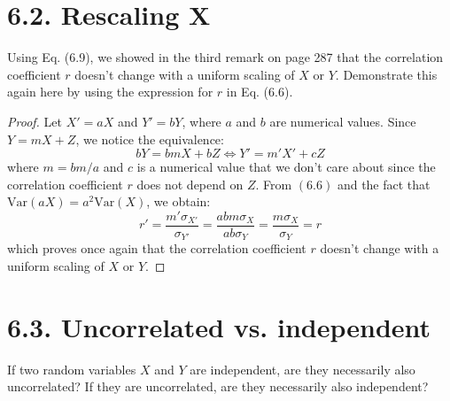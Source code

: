 \section*{6.2. Rescaling X}
Using Eq. (6.9), we showed in the third remark on page 287 that the
correlation coefficient $r$ doesn't change with a uniform scaling of
$X$ or $Y$. Demonstrate this again here by using the expression
for $r$ in Eq. (6.6).

\vspace{1em}

\begin{proof}
    Let $X' = aX$ and $Y' = bY$, where $a$ and $b$ are numerical values.
    Since $Y = mX + Z$, we notice the equivalence:
    \[
        bY = bmX + bZ \iff Y' = m'X' + cZ
    \] 
    where $m = bm/a$ and $c$ is a numerical value that we don't care about
    since the correlation coefficient $r$ does not depend on $Z$.
    From $(6.6)$ and the fact that $\text{Var}(aX) = a^2\text{Var}(X)$, we obtain:
     \[
         r' 
         = \frac{m'\sigma_{X'}}{\sigma_{Y'}} 
         = \frac{abm\sigma_{X}}{ab\sigma_{Y}}
         = \frac{m\sigma_X}{\sigma_Y} 
         = r
    \] 
    which proves once again that the correlation coefficient $r$ doesn't 
    change with a uniform scaling of $X$ or $Y$.
\end{proof}

\section*{6.3. Uncorrelated vs. independent}
If two random variables $X$ and $Y$ are independent, are they necessarily
also uncorrelated? If they are uncorrelated, are they necessarily also independent?

\vspace{1em}

